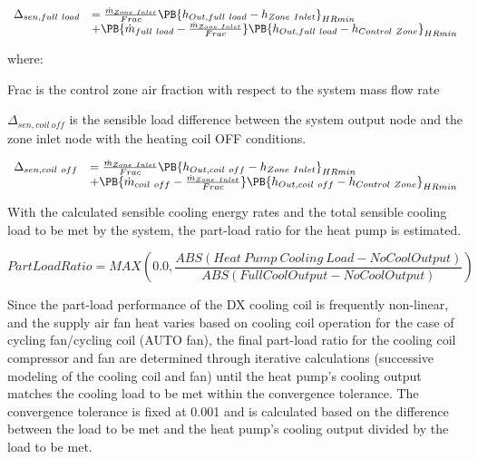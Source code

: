 \begin{equation}
  \begin{array}{rl}
    \Delta_{sen,full~load} &= \frac{\dot{m}_{Zone~Inlet}}{Frac} \PB{h_{Out,full~load} - h_{Zone~Inlet}}_{HRmin} \\
                           &+ \PB{\dot{m}_{full~load} - \frac{\dot{m}_{Zone~Inlet}}{Frac}} \PB{h_{Out,full~load} - h_{Control~Zone}}_{HRmin}
  \end{array}
\end{equation}

where:

Frac is the control zone air fraction with respect to the system mass flow rate

\(\Delta_{sen,coil~off}\) is the sensible load difference between the system output node and the zone inlet node with the heating coil OFF conditions.

\begin{equation}
  \begin{array}{rl}
    \Delta_{sen,coil~off} &= \frac{\dot{m}_{Zone~Inlet}}{Frac} \PB{h_{Out,coil~off} - h_{Zone~Inlet}}_{HRmin} \\
                           &+ \PB{\dot{m}_{coil~off} - \frac{\dot{m}_{Zone~Inlet}}{Frac}} \PB{h_{Out,coil~off} - h_{Control~Zone}}_{HRmin}
  \end{array}
\end{equation}

With the calculated sensible cooling energy rates and the total sensible cooling load to be met by the system, the part-load ratio for the heat pump is estimated.

\begin{equation}
PartLoadRatio = MAX\left( {0.0,\frac{{ABS\left( {Heat~Pump~Cooling~Load - NoCoolOutput} \right)}}{{ABS\left( {FullCoolOutput - NoCoolOutput} \right)}}} \right)
\label{eq:UnitarySystemPartLoadRatioCooling586}
\end{equation}

Since the part-load performance of the DX cooling coil is frequently non-linear, and the supply air fan heat varies based on cooling coil operation for the case of cycling fan/cycling coil (AUTO fan), the final part-load ratio for the cooling coil compressor and fan are determined through iterative calculations (successive modeling of the cooling coil and fan) until the heat pump's cooling output matches the cooling load to be met within the convergence tolerance. The convergence tolerance is fixed at 0.001 and is calculated based on the difference between the load to be met and the heat pump's cooling output divided by the load to be met.

